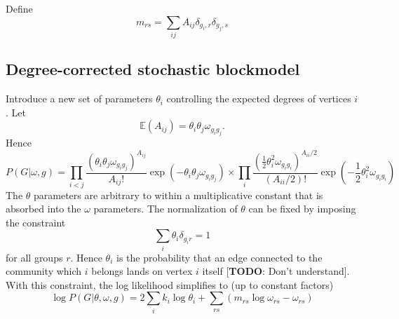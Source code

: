 \documentclass[11pt]{article}
\numberwithin{equation}{section}
\begin{document}
Define 
\begin{equation}
m_{rs} = \sum_{ij} A_{ij} \delta_{g_i, r} \delta_{g_j, s}
\end{equation}

\subsection{Degree-corrected stochastic blockmodel}
Introduce a new set of parameters $\theta_i$ controlling the expected degrees of vertices $i$. Let
\begin{equation}
\mathbb{E}(A_{ij}) = \theta_i \theta_j \omega_{g_i g_j}.
\end{equation}
Hence
\begin{equation}
P(G|\omega, g) = \prod_{i<j} \frac{(\theta_i \theta_j \omega_{g_i g_j})^{A_{ij}}}{A_{ij}!}\exp(- \theta_i \theta_j \omega_{g_i g_j}) \times \prod_{i} \frac{(\frac{1}{2} \theta_i^2 \omega_{g_i g_i})^{A_{ii}/2}}{(A_{ii}/2)!}\exp(- \frac{1}{2} \theta_i^2 \omega_{g_i g_i})
\end{equation}
The $\theta$ parameters are arbitrary to within a multiplicative constant that is absorbed into the $\omega$ parameters. The normalization of $\theta$ can be fixed by imposing the constraint
\begin{equation}
\sum_i \theta_i \delta_{g_i r} = 1
\end{equation}
for all groups $r$. Hence $\theta_i$ is the probability that an edge connected to the community which $i$ belongs lands on vertex $i$ itself [\textbf{TODO}: Don't understand]. With this constraint, the log likelihood simplifies to (up to constant factors)
\begin{equation}
\log P(G|\theta, \omega, g) = 2 \sum_i k_i \log \theta_i + \sum_{rs} (m_{rs} \log \omega_{rs} - \omega_{rs})
\end{equation}



\newpage
 
\end{document}
